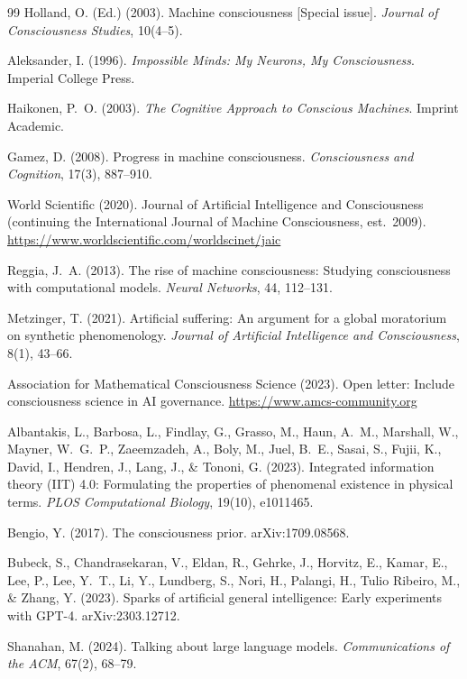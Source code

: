 \documentclass[10pt]{article}
\begin{document}
\begin{thebibliography}{99}
Holland, O. (Ed.) (2003).
Machine consciousness [Special issue].
\emph{Journal of Consciousness Studies}, 10(4--5).

Aleksander, I. (1996).
\emph{Impossible Minds: My Neurons, My Consciousness}.
Imperial College Press.

Haikonen, P.~O. (2003).
\emph{The Cognitive Approach to Conscious Machines}.
Imprint Academic.

Gamez, D. (2008).
Progress in machine consciousness.
\emph{Consciousness and Cognition}, 17(3), 887--910.

World Scientific (2020).
Journal of Artificial Intelligence and Consciousness (continuing the International Journal of Machine Consciousness, est.\ 2009).
\url{https://www.worldscientific.com/worldscinet/jaic}

Reggia, J.~A. (2013).
The rise of machine consciousness: Studying consciousness with computational models.
\emph{Neural Networks}, 44, 112--131.

Metzinger, T. (2021).
Artificial suffering: An argument for a global moratorium on synthetic phenomenology.
\emph{Journal of Artificial Intelligence and Consciousness}, 8(1), 43--66.

Association for Mathematical Consciousness Science (2023).
Open letter: Include consciousness science in AI governance.
\url{https://www.amcs-community.org}

Albantakis, L., Barbosa, L., Findlay, G., Grasso, M., Haun, A.~M., Marshall, W., Mayner, W.~G.~P., Zaeemzadeh, A., Boly, M., Juel, B.~E., Sasai, S., Fujii, K., David, I., Hendren, J., Lang, J., \& Tononi, G. (2023).
Integrated information theory (IIT) 4.0: Formulating the properties of phenomenal existence in physical terms.
\emph{PLOS Computational Biology}, 19(10), e1011465.

Bengio, Y. (2017).
The consciousness prior.
arXiv:1709.08568.

Bubeck, S., Chandrasekaran, V., Eldan, R., Gehrke, J., Horvitz, E., Kamar, E., Lee, P., Lee, Y.~T., Li, Y., Lundberg, S., Nori, H., Palangi, H., Tulio Ribeiro, M., \& Zhang, Y. (2023).
Sparks of artificial general intelligence: Early experiments with GPT-4.
arXiv:2303.12712.

Shanahan, M. (2024).
Talking about large language models.
\emph{Communications of the ACM}, 67(2), 68--79.


\end{thebibliography}
\end{document}
